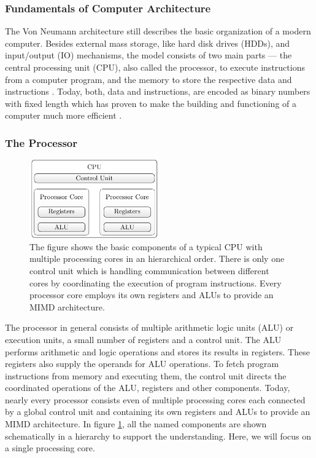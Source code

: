 \documentclass{stdlocal}
\begin{document}
  \subsubsection*{Fundamentals of Computer Architecture}
    The Von Neumann architecture still describes the basic organization of a modern computer.
    Besides external mass storage, like hard disk drives (HDDs), and input/output (IO) mechanisms, the model consists of two main parts --- the central processing unit (CPU), also called the processor, to execute instructions from a computer program, and the memory to store the respective data and instructions \autocite{hennessy2019}.
    Today, both, data and instructions, are encoded as binary numbers with fixed length which has proven to make the building and functioning of a computer much more efficient \autocite{patterson2014}.

    \subsubsection*{The Processor}
    \begin{figure}
      \center
      \includegraphics[width=0.5\textwidth]{figures/cpu_components.pdf}
      \caption[Hierarchical Order of CPU Components]{%
        The figure shows the basic components of a typical CPU with multiple processing cores in an hierarchical order.
        There is only one control unit which is handling communication between different cores by coordinating the execution of program instructions.
        Every processor core employs its own registers and ALUs to provide an MIMD architecture.
      }
      \label{fig:cpu-components}
    \end{figure}
    The processor in general consists of multiple arithmetic logic units (ALU) or execution units, a small number of registers and a control unit.
    The ALU performs arithmetic and logic operations and stores its results in registers.
    These registers also supply the operands for ALU operations.
    To fetch program instructions from memory and executing them, the control unit directs the coordinated operations of the ALU, registers and other components.
    Today, nearly every processor consists even of multiple processing cores each connected by a global control unit and containing its own registers and ALUs to provide an MIMD architecture.
    In figure \ref{fig:cpu-components}, all the named components are shown schematically in a hierarchy to support the understanding.
    Here, we will focus on a single processing core.
\end{document}
